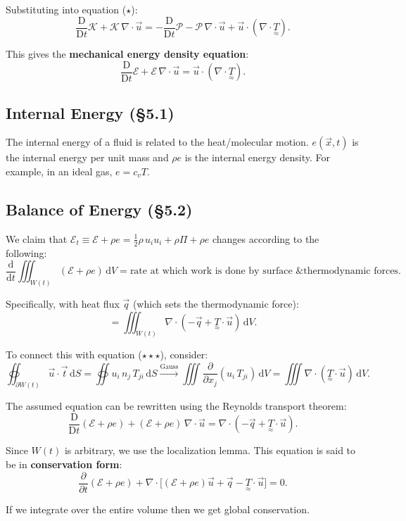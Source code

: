 \documentclass[11pt,a4paper]{article}
\newcommand{\D}{\mathrm{D}}
\newcommand{\Dt}{\frac{\D}{\D t}}
\newcommand{\pdt}[1]{\frac{\partial #1}{\partial t}}
\newcommand{\pdx}[2]{\frac{\partial #1}{\partial #2}}
\newcommand{\xv}{\vec{x}}
\newcommand{\uv}{\vec{u}}
\newcommand{\tv}{\vec{t}}
\newcommand{\tens}[1]{\underset{\approx}{#1}}
\begin{document}
Substituting into equation ($\star$):
\[
    \Dt\mathcal{K} + \mathcal{K}\,\nabla\cdot\uv = -\Dt\mathcal{P} - \mathcal{P}\,\nabla\cdot\uv + \uv\cdot(\nabla\cdot\tens{T}).
\]

This gives the \textbf{mechanical energy density equation}:
\[
    \boxed{\Dt\mathcal{E} + \mathcal{E}\,\nabla\cdot\uv = \uv\cdot(\nabla\cdot\tens{T}).}
    \tag{$\star\star\star$}
\]

\subsection{Internal Energy (\S5.1)}

The internal energy of a fluid is related to the heat/molecular motion. $e(\xv,t)$ is the internal energy per unit mass and $\rho e$ is the internal energy density. For example, in an ideal gas, $e = c_v T$.

\subsection{Balance of Energy (\S5.2)}

We claim that $\mathcal{E}_t \equiv \mathcal{E} + \rho e = \tfrac{1}{2}\rho\,u_i u_i + \rho\Pi + \rho e$ changes according to the following:
\[
    \frac{\mathrm{d}}{\mathrm{d}t}\iiint_{W(t)} (\mathcal{E} + \rho e)\,\mathrm{d}V
    = \text{rate at which work is done by surface \& thermodynamic forces}.
\]

Specifically, with heat flux $\vec{q}$ (which sets the thermodynamic force):
\[
    = \iiint_{W(t)} \nabla\cdot(-\vec{q} + \tens{T}\cdot\uv)\,\mathrm{d}V.
\]

To connect this with equation ($\star\star\star$), consider:
\[
    \oiint_{\partial W(t)} \uv\cdot\tv\,\mathrm{d}S = \oiint u_i\,n_j\,T_{ji}\,\mathrm{d}S \xrightarrow{\text{Gauss}} \iiint \pdx{}{x_j}(u_i\,T_{ji})\,\mathrm{d}V = \iiint \nabla\cdot(\tens{T}\cdot\uv)\,\mathrm{d}V.
\]

The assumed equation can be rewritten using the Reynolds transport theorem:
\[
    \Dt(\mathcal{E} + \rho e) + (\mathcal{E} + \rho e)\,\nabla\cdot\uv = \nabla\cdot(-\vec{q} + \tens{T}\cdot\uv).
\]

Since $W(t)$ is arbitrary, we use the localization lemma. This equation is said to be in \textbf{conservation form}:
\[
    \boxed{\pdt{}(\mathcal{E} + \rho e) + \nabla\cdot\bigl[(\mathcal{E} + \rho e)\uv + \vec{q} - \tens{T}\cdot\uv\bigr] = 0.}
\]

If we integrate over the entire volume then we get global conservation.
\end{document}
